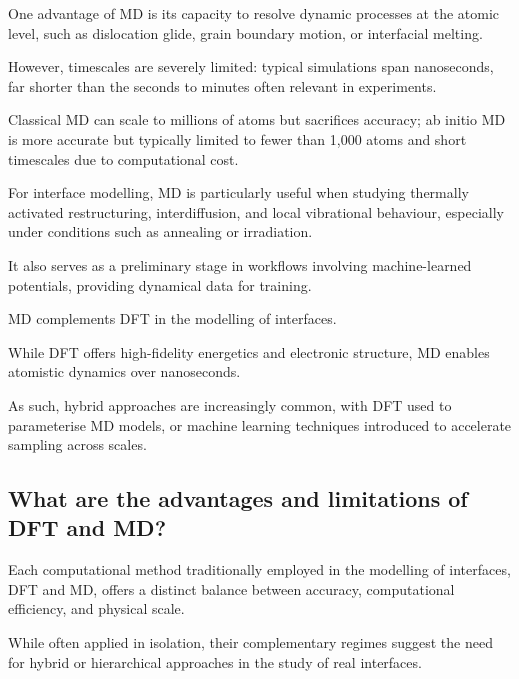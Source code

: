 
One advantage of MD is its capacity to resolve dynamic processes at the atomic level, such as dislocation glide, grain
boundary motion, or interfacial melting\cite{Chagarov2015-ol}.

However, timescales are severely limited: typical simulations span nanoseconds, far shorter than the seconds to minutes
often relevant in experiments.

Classical MD can scale to millions of atoms but sacrifices accuracy; ab initio MD is more accurate but typically limited
to fewer than 1,000 atoms and short timescales due to computational cost\cite{Khot2025-hh}.


For interface modelling, MD is particularly useful when studying thermally activated restructuring, interdiffusion, and
local vibrational behaviour, especially under conditions such as annealing or irradiation.

It also serves as a preliminary stage in workflows involving machine-learned potentials, providing dynamical data for
training\cite{Khot2025-hh}.


MD complements DFT in the modelling of interfaces.

While DFT offers high-fidelity energetics and electronic structure, MD enables atomistic dynamics over nanoseconds\cite{Khot2025-hh, Leung2020-tv, Arantes2007-ea}.

As such, hybrid approaches are increasingly common, with DFT used to parameterise MD models, or machine learning
techniques introduced to accelerate sampling across scales\cite{Schutt2018-xc, Butler2019-ws, Khot2025-hh}.


\subsection{What are the advantages and limitations of DFT and MD?}


Each computational method traditionally employed in the modelling of interfaces, DFT and MD, offers a distinct balance
between accuracy, computational efficiency, and physical scale.

While often applied in isolation, their complementary regimes suggest the need for hybrid or hierarchical approaches in
the study of real interfaces\cite{Leung2020-tv}.

